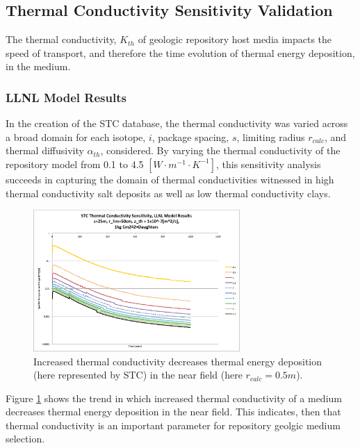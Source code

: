 \subsection{Thermal Conductivity Sensitivity Validation}\label{sec:conductivity}
The thermal conductivity, $K_{th}$ of geologic repository host media impacts 
the speed of transport, and therefore the time evolution of thermal energy 
deposition, in the medium. 

\FloatBarrier
\subsubsection{LLNL Model Results}
In the creation of the \gls{STC} database, the thermal conductivity was varied 
across a broad domain for each isotope, $i$, package spacing, $s$, limiting 
radius $r_{calc}$, and thermal diffusivity $\alpha_{th}$, considered.  By 
varying the thermal conductivity of the repository model from 0.1 to 4.5
$[W\cdot m^{-1} \cdot K^{-1}]$, this sensitivity analysis succeeds in capturing the domain of 
thermal conductivities witnessed in high thermal conductivity salt deposits as 
well as low thermal conductivity clays.

\begin{figure}[htbp!]
\begin{center}
\includegraphics[width=0.7\textwidth]{./chapters/demonstration/conductivity/Cm242kth_alpha_low.eps}
\end{center}
\caption[$K_{th}$ Sensitivity for Low $\alpha_{th}$ in LLNL Model]{Increased thermal conductivity decreases thermal energy deposition 
(here represented by \gls{STC}) in the near field (here $r_{calc} = 0.5m$).}
\label{fig:Cm242Kth_alpha_low}
\end{figure}

Figure \ref{fig:Cm242Kth_alpha_low} shows the trend in which increased thermal conductivity of a medium decreases thermal energy 
deposition in the near field. This indicates, then that thermal conductivity is 
an important parameter for repository geolgic medium selection. 

